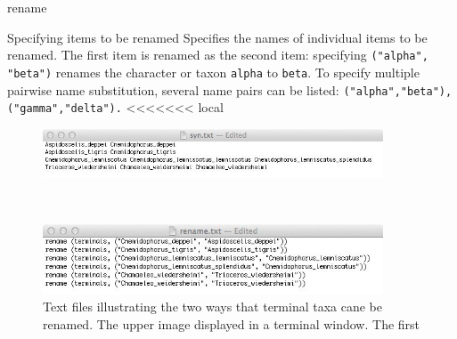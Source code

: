 \begin{command}{rename}{}
\begin{arguments}
\begin{argumentgroup}{Specifying items to be renamed}
                {Specifies the names of individual items to be renamed. The first item is renamed
                as the second item: specifying \texttt{("alpha",\\"beta")} renames the character or taxon
                \texttt{alpha} to \texttt{beta}. To specify multiple pairwise name substitution, several 
                name pairs can be listed: \texttt{("alpha","beta"),("gamma","delta").}}
                {}
<<<<<<< local
            \\    
\begin{figure}[th!]
    \begin{center}
        \includegraphics[width=0.9\textwidth]{doc/figures/syn.jpg}
    \end{center}
    \label{fig:syn}
\end{figure}
\,
\begin{figure}[th!]
    \begin{center}
        \includegraphics[width=0.9\textwidth]{doc/figures/rename.jpg}
    \end{center}
    \caption{Text files illustrating the two ways that terminal taxa cane be renamed.  The upper image  displayed in a terminal window. The first }
    \label{fig:rename}
\end{figure}

        \end{argumentgroup}
          

\end{arguments}
\end{command}
